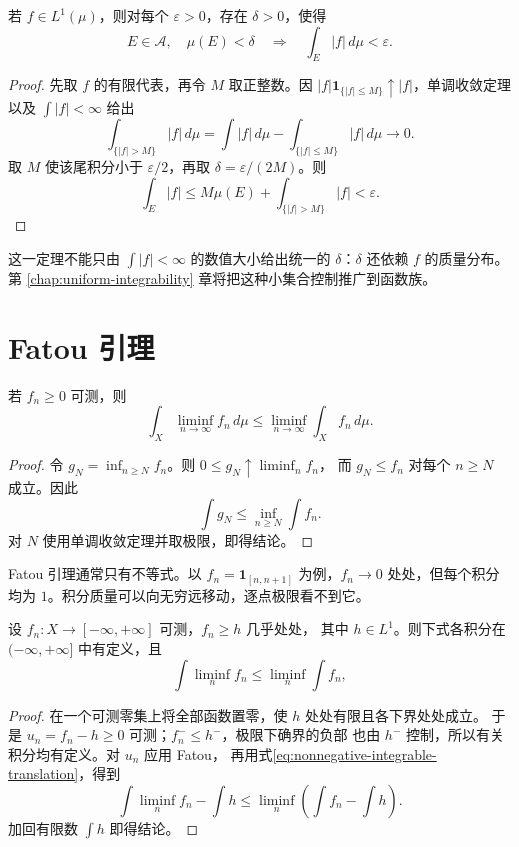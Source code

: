 \begin{theorem}[积分的绝对连续性]
\label{thm:absolute-continuity-of-integral}
若 \(f\in L^1(\mu)\)，则对每个 \(\varepsilon>0\)，存在
\(\delta>0\)，使得
\[
E\in\mathcal A,\quad\mu(E)<\delta\quad\Longrightarrow\quad
 \int_E|f|\,d\mu<\varepsilon .
\]
\end{theorem}

\begin{proof}
先取 \(f\) 的有限代表，再令 \(M\) 取正整数。因
\(|f|\mathbf1_{\{|f|\le M\}}\uparrow|f|\)，单调收敛定理以及
\(\int|f|<\infty\) 给出
\[
 \int_{\{|f|>M\}}|f|\,d\mu
 =\int|f|\,d\mu-\int_{\{|f|\le M\}}|f|\,d\mu
 \longrightarrow0.
\]
取 \(M\) 使该尾积分小于 \(\varepsilon/2\)，再取
\(\delta=\varepsilon/(2M)\)。则
\[
 \int_E|f|
 \le M\mu(E)+\int_{\{|f|>M\}}|f|
 <\varepsilon .
\]
\end{proof}

这一定理不能只由 \(\int|f|<\infty\) 的数值大小给出统一的
\(\delta\)：\(\delta\) 还依赖 \(f\) 的质量分布。第
\ref{chap:uniform-integrability} 章将把这种小集合控制推广到函数族。

\section{Fatou 引理}

\begin{theorem}[Fatou 引理]
\label{thm:fatou}
若 \(f_n\ge0\) 可测，则
\[
 \int_X\liminf_{n\to\infty}f_n\,d\mu
 \le\liminf_{n\to\infty}\int_Xf_n\,d\mu .
\]
\end{theorem}

\begin{proof}
令 \(g_N=\inf_{n\ge N}f_n\)。则 \(0\le g_N\uparrow\liminf_nf_n\)，
而 \(g_N\le f_n\) 对每个 \(n\ge N\) 成立。因此
\[
 \int g_N\le\inf_{n\ge N}\int f_n.
\]
对 \(N\) 使用单调收敛定理并取极限，即得结论。
\end{proof}

Fatou 引理通常只有不等式。以
\(f_n=\mathbf1_{[n,n+1]}\) 为例，\(f_n\to0\) 处处，但每个积分均为
\(1\)。积分质量可以向无穷远移动，逐点极限看不到它。

\begin{corollary}
\label{cor:fatou-integrable-lower-bound}
设 \(f_n:X\to[-\infty,+\infty]\) 可测，\(f_n\ge h\) 几乎处处，
其中 \(h\in L^1\)。则下式各积分在 \((-\infty,+\infty]\) 中有定义，且
\[
 \int\liminf_nf_n\le\liminf_n\int f_n,
\]
\end{corollary}

\begin{proof}
在一个可测零集上将全部函数置零，使 \(h\) 处处有限且各下界处处成立。
于是 \(u_n=f_n-h\ge0\) 可测；\(f_n^-\le h^-\)，极限下确界的负部
也由 \(h^-\) 控制，所以有关积分均有定义。对 \(u_n\) 应用 Fatou，
再用式\eqref{eq:nonnegative-integrable-translation}，得到
\[
 \int\liminf_n f_n-\int h
 \le\liminf_n\left(\int f_n-\int h\right).
\]
加回有限数 \(\int h\) 即得结论。
\end{proof}

